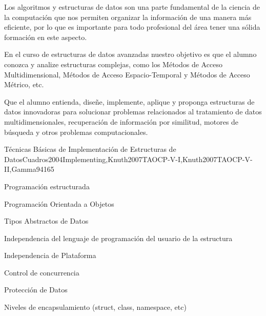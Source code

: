 \begin{syllabus}


\begin{justification}
Los algoritmos y estructuras de datos son una parte fundamental de la ciencia de la computación que nos permiten organizar la información de una manera más eficiente, por lo que es importante para todo profesional del área tener una sólida formación en este aspecto.

En el curso de estructuras de datos avanzadas nuestro objetivo es que el alumno conozca y analize estructuras complejas, como los Métodos de Acceso Multidimensional, Métodos de Acceso Espacio-Temporal y Métodos de Acceso Métrico, etc.
\end{justification}

\begin{goals}
\item Que el alumno entienda, diseñe, implemente, aplique y
proponga estructuras de datos innovadoras para solucionar
problemas relacionados al tratamiento de datos multidimensionales,
recuperación de información por similitud, motores de búsqueda y
otros problemas computacionales.
\end{goals}

\begin{outcomes}
\end{outcomes}

\begin{unit}{Técnicas Básicas de Implementación de Estructuras de Datos}{Cuadros2004Implementing,Knuth2007TAOCP-V-I,Knuth2007TAOCP-V-II,Gamma94}{16}{5}
   \begin{topics}
         \item Programación estructurada
         \item Programación Orientada a Objetos
         \item Tipos Abstractos de Datos
         \item Independencia del lenguaje de programación del usuario de la estructura
         \item Independencia de Plataforma
         \item Control de concurrencia
         \item Protección de Datos
         \item Niveles de encapsulamiento (struct, class, namespace, etc)
   \end{topics}


\end{unit}
\end{syllabus}
